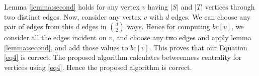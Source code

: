 Lemma \ref{lemma:second} holds for any vertex $v$ having $|S|$ and $|T|$ vertices through two distinct edges. Now, consider any vertex $v$ with $d$ edges.
We can choose any pair of edges from this $d$ edges in $\binom{d}{2}$ ways.
Hence for computing $bc[v]$, we consider all the edges incident on $v$, and choose any two edges and apply lemma \ref{lemma:second}, and add those values to $bc[v]$. This proves that our Equation \ref{eq4} is correct. The proposed algorithm calculates betweenness centrality for vertices using \ref{eq4}. Hence the proposed algorithm is correct.





